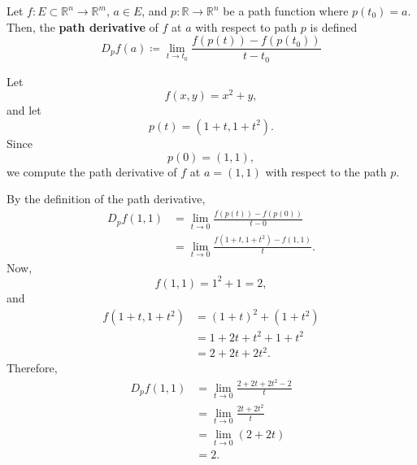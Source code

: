 	\begin{definition}
	  \label{def:path-derivative}
		Let $f: E \subset \mathbb{R}^n \to \mathbb{R}^m$, $a \in E$, and $p: \mathbb{R} \to \mathbb{R}^n$ be a path function where $p(t_0) = a$. Then, the \textbf{path derivative} of $f$ at $a$ with respect to path $p$ is defined  
		\begin{equation}
			D_p f(a) \coloneqq \lim_{t \to t_0} \frac{f(p(t)) - f(p(t_0))}{t - t_0} 
		\end{equation}
	\end{definition}

	\begin{example}
	  \label{ex:path-derivative-of-a-scalar-field}
		Let
		\begin{equation}
			f(x,y) = x^2+y,
		\end{equation}
		and let
		\begin{equation}
			p(t) = (1+t, 1+t^2).
		\end{equation}
		Since
		\begin{equation}
			p(0) = (1,1),
		\end{equation}
		we compute the path derivative of $f$ at $a=(1,1)$ with respect to the path $p$.

		By the definition of the path derivative,
		\begin{align}
			D_p f(1,1)
			&=
			\lim_{t\to 0}
			\frac{f(p(t))-f(p(0))}{t-0} \\
			&=
			\lim_{t\to 0}
			\frac{f(1+t,1+t^2)-f(1,1)}{t}.
		\end{align}
		Now,
		\begin{equation}
			f(1,1) = 1^2+1 = 2,
		\end{equation}
		and
		\begin{align}
			f(1+t,1+t^2)
			&=
			(1+t)^2 + (1+t^2) \\
			&=
			1+2t+t^2+1+t^2 \\
			&=
			2+2t+2t^2.
		\end{align}
		Therefore,
		\begin{align}
			D_p f(1,1)
			&=
			\lim_{t\to 0}
			\frac{2+2t+2t^2-2}{t} \\
			&=
			\lim_{t\to 0}
			\frac{2t+2t^2}{t} \\
			&=
			\lim_{t\to 0}
			(2+2t) \\
			&=
			2.
		\end{align}
	\end{example}

